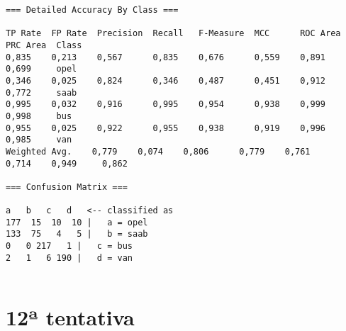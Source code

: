 \documentclass[
	article,			%
	11pt,				%
	oneside,			%
	a4paper,			%
	english,			%
	brazil,				%
	sumario=tradicional
	]{abntex2}
\begin{document}
\begin{lstlisting}
=== Detailed Accuracy By Class ===

TP Rate  FP Rate  Precision  Recall   F-Measure  MCC      ROC Area  PRC Area  Class
0,835    0,213    0,567      0,835    0,676      0,559    0,891     0,699     opel
0,346    0,025    0,824      0,346    0,487      0,451    0,912     0,772     saab
0,995    0,032    0,916      0,995    0,954      0,938    0,999     0,998     bus
0,955    0,025    0,922      0,955    0,938      0,919    0,996     0,985     van
Weighted Avg.    0,779    0,074    0,806      0,779    0,761      0,714    0,949     0,862     

=== Confusion Matrix ===

a   b   c   d   <-- classified as
177  15  10  10 |   a = opel
133  75   4   5 |   b = saab
0   0 217   1 |   c = bus
2   1   6 190 |   d = van


\end{lstlisting}

\section{12ª tentativa}
\end{document}
